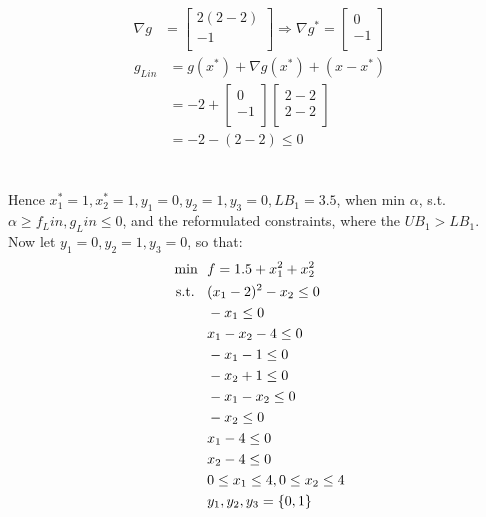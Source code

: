 \documentclass{article}
\begin{document}
\begin{equation}
\begin{split}
\nabla g & = 
    \begin{bmatrix}
        2(2 - 2)\\
        -1\\
    \end{bmatrix} \Longrightarrow
\nabla g^* = 
    \begin{bmatrix}
        0\\
        -1\\
    \end{bmatrix}
\end{split}
\end{equation}
\begin{equation}
\begin{split}
    g_{Lin} 
        & = g(x^*) + \nabla g(x^*) + (x-x^*)\\
        & = -2 + 
            \begin{bmatrix}
                0\\
                -1\\
            \end{bmatrix}
            \begin{bmatrix}
                2 - 2\\
                2 - 2\\
            \end{bmatrix}\\
        & = -2 - (2 - 2) \leq 0
\end{split}
\end{equation}
\\~\\
Hence $x_{1}^{*} = 1, x_{2}^{*} = 1, y_1 = 0, y_2 = 1, y_3 = 0, LB_1 = 3.5$, when min $\alpha$, s.t. $\alpha \geq f_Lin, g_Lin \leq 0$, and the reformulated constraints, where the $UB_1 > LB_1$.\\

Now let $y_1 = 0, y_2 = 1, y_3 = 0$, so that:
\begin{equation}
\begin{split}
    \text{min \space} & f = 1.5 + x_{1}^{2} + x_{2}^{2}\\
    \text{s.t. \space} 
    & \space (x_1 - 2)^2 -x_2 \leq 0\\
    & - x_1 \leq 0\\
    & x_1 - x_2 - 4 \leq 0\\
    & - x_1 - 1 \leq 0\\
    & - x_2 + 1 \leq 0\\
    & - x_1 - x_2 \leq 0\\
    & - x_2 \leq 0\\
    & x_1 - 4 \leq 0\\
    & x_2 - 4 \leq 0\\
    & 0 \leq x_1 \leq 4, 0 \leq x_2 \leq 4\\
    & y_1, y_2, y_3 = \{0, 1\}\\
\end{split}
\end{equation}\\
\end{document}
